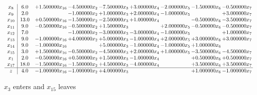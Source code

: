 \documentclass[10pt]{article}
\begin{document}
 \[\begin{array}{c| c c@{\hskip 2pt} c@{\hskip 2pt} c@{\hskip 2pt} c@{\hskip 2pt} c@{\hskip 2pt} c@{\hskip 2pt} c@{\hskip 2pt} }
 x_{8}   &  6.0 & + 1.500000 x_{16} & -4.500000 x_{2} & -7.500000 x_{3} & + 3.000000 x_{4} & -2.000000 x_{5} & -1.500000 x_{6} & -0.500000 x_{7}\\
 x_{9}   &  2.0  &   & -1.000000 x_{2} & + 1.000000 x_{3} & + 2.000000 x_{4} & -1.000000 x_{5} &   & + 3.000000 x_{7}\\
 x_{10}   &  13.0 & + 0.500000 x_{16} & -1.500000 x_{2} & -2.500000 x_{3} & + 1.000000 x_{4} &   & -0.500000 x_{6} & -3.500000 x_{7}\\
 x_{11}   &  9.0 & -0.500000 x_{16} & -0.500000 x_{2} & + 1.500000 x_{3} &   & + 2.000000 x_{5} & -0.500000 x_{6} & -0.500000 x_{7}\\
 x_{12}   &  7.0  &   & -1.000000 x_{2} & -3.000000 x_{3} & -3.000000 x_{4} & -1.000000 x_{5} &   & + 1.000000 x_{7}\\
 x_{13}   &  9.0 & -1.000000 x_{16} & + 4.000000 x_{2} & + 5.000000 x_{3} & -1.000000 x_{4} & + 2.000000 x_{5} & + 3.000000 x_{6} & + 3.000000 x_{7}\\
 x_{14}   &  9.0 & -1.000000 x_{16} &   & + 5.000000 x_{3} & -1.000000 x_{4} & -1.000000 x_{5} & + 1.000000 x_{6} &   \\
 x_{15}   &  3.0 & + 1.500000 x_{16} & -0.500000 x_{2} & -4.500000 x_{3} & + 2.000000 x_{4} & + 1.000000 x_{5} & -3.500000 x_{6} & -4.500000 x_{7}\\
 x_{1}   &  2.0 & -0.500000 x_{16} & + 0.500000 x_{2} & + 1.500000 x_{3} & -1.000000 x_{4} &   & + 0.500000 x_{6} & + 0.500000 x_{7}\\
 x_{17}   &  18.0 & -1.500000 x_{16} & -1.500000 x_{2} & + 4.500000 x_{3} & -4.000000 x_{4} &   & + 3.500000 x_{6} & + 3.500000 x_{7}\\
\hline
z    &  4.0 & -1.000000 x_{16} & -1.000000 x_{2} & + 4.000000 x_{3} &    &   & + 1.000000 x_{6} & -1.000000 x_{7}\\
\end{array}\]


 $ x_{3} $ enters and $ x_{15} $ leaves 
\end{document}

